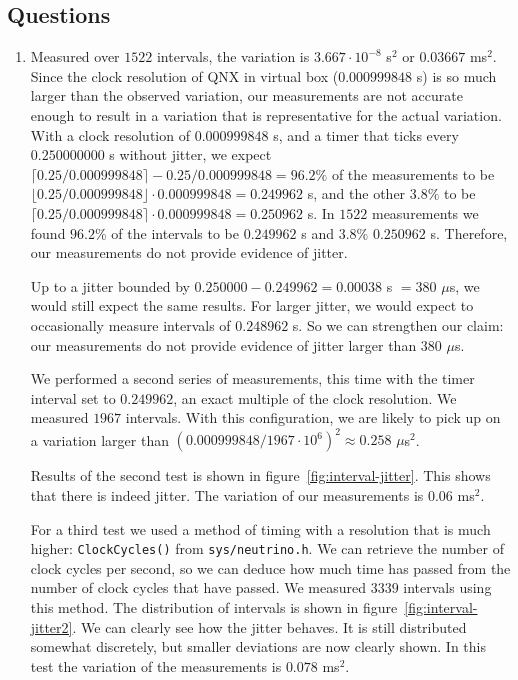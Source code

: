 \documentclass[a4paper,twoside,11pt]{article}
\begin{document}
\subsection{Questions} \label{sec:1_4}
\begin{enumerate}
 \item Measured over $1522$ intervals, the variation is $3.667 \cdot 10^{-8}$ s$^2$ or $0.03667$ ms$^2$. Since the clock resolution of QNX in virtual box ($0.000999848$ s) is so much larger than the observed variation, our measurements are not accurate enough to result in a variation that is representative for the actual variation. With a clock resolution of $0.000999848$ s, and a timer that ticks every $0.250000000$ s without jitter, we expect $\lceil 0.25/0.000999848 \rceil - 0.25/0.000999848 = 96.2\%$ of the measurements to be $\lfloor 0.25/0.000999848 \rfloor \cdot 0.000999848 = 0.249962$ s, and the other $3.8\%$ to be $\lceil 0.25/0.000999848 \rceil \cdot 0.000999848 = 0.250962$ s. In $1522$ measurements we found $96.2\%$ of the intervals to be $0.249962$ s and $3.8\%$ $0.250962$ s. Therefore, our measurements do not provide evidence of jitter.
 
 Up to a jitter bounded by $0.250000 - 0.249962 = 0.00038$ s $= 380$ $\mu$s, we would still expect the same results. For larger jitter, we would expect to occasionally measure intervals of $0.248962$ s. So we can strengthen our claim: our measurements do not provide evidence of jitter larger than $380$ $\mu$s.
 
 We performed a second series of measurements, this time with the timer interval set to $0.249962$, an exact multiple of the clock resolution. We measured $1967$ intervals. With this configuration, we are likely to pick up on a variation larger than $(0.000999848/1967 \cdot 10^6)^2 \approx 0.258$ $\mu$s$^2$.
 
 Results of the second test is shown in figure~\ref{fig:interval-jitter}. This shows that there is indeed jitter. The variation of our measurements is $0.06$ ms$^2$.
 
 For a third test we used a method of timing with a resolution that is much higher: \texttt{ClockCycles()} from \texttt{sys/neutrino.h}. We can retrieve the number of clock cycles per second, so we can deduce how much time has passed from the number of clock cycles that have passed. We measured $3339$ intervals using this method. The distribution of intervals is shown in figure~\ref{fig:interval-jitter2}. We can clearly see how the jitter behaves. It is still distributed somewhat discretely, but smaller deviations are now clearly shown. In this test the variation of the measurements is $0.078$ ms$^2$.
 

\end{enumerate}
\end{document}
